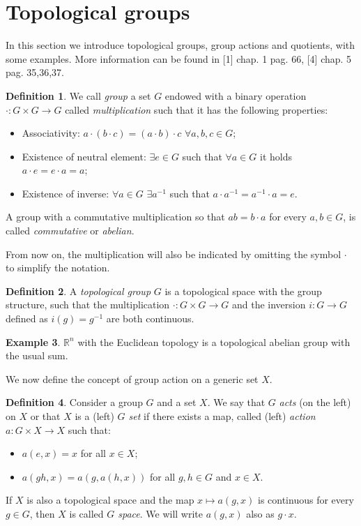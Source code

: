 \documentclass[12pt,a4paper]{report}
\theoremstyle{definition}
\newtheorem{Def}{Definition}[chapter]
\theoremstyle{Theorem}
\theoremstyle{definition}
\newtheorem{Ex}[Def]{Example}
\theoremstyle{definition}
\begin{document}
	\section{Topological groups}
	In this section we introduce topological groups, group actions and quotients, with some examples. More information can be found in [1] chap. 1 pag. 66, [4] chap. 5 pag. 35,36,37. 
	\begin{Def}
		We call \textit{group} a set $G$ endowed with a binary operation $\cdot:G\times G\rightarrow G$ called \textit{multiplication} such that it has the following properties:
		\begin{itemize}
			\item Associativity: $a\cdot (b\cdot c)=(a\cdot b)\cdot c$ $\forall a,b,c\in G$;
			\item Existence of neutral element: $\exists e\in G$ such that $\forall a\in G$ it holds $a\cdot e=e\cdot a=a$;
			\item Existence of inverse: $\forall a\in G$ $\exists a^{-1}$ such that $a\cdot a^{-1}=a^{-1}\cdot a=e$.
		\end{itemize}
		A group with a commutative multiplication so that $ab= b\cdot a$ for every $a,b\in G$, is called \textit{commutative} or \textit{abelian}.
	\end{Def}
	From now on, the multiplication will also be indicated by omitting the symbol $\cdot$ to simplify the notation.
	\begin{Def}
		A \textit{topological group} $G$ is a topological space with the group structure, such that the multiplication $\cdot:G\times G\rightarrow G$ and the inversion $i:G\rightarrow G$ defined as $i(g)=g^{-1}$ are both continuous.
	\end{Def}
	\begin{Ex}
		$\mathbb{R}^n$ with the Euclidean topology is a topological abelian group with the usual sum.
	\end{Ex}
	We now define the concept of group action on a generic set $X$.
	\begin{Def}
		Consider a group $G$ and a set $X$. We say that $G$ \textit{acts} (on the left) on $X$ or that $X$ is a (left) \textit{$G$ set} if there exists a map, called (left) \textit{action} $a:G\times X\rightarrow X$ such that:
		\begin{itemize}
			\item 	$a(e,x)=x$ for all $x\in X$;
			\item $a(gh,x)=a(g,a(h,x))$ for all $g,h\in G$ and $x\in X$.
		\end{itemize} 
		If $X$ is also a topological space and the map $x\longmapsto a(g,x)$ is continuous for every $g\in G$, then $X$ is called \textit{$G$ space}.
		We will write $a(g,x)$ also as $g\cdot x$.
	\end{Def}
\end{document}
